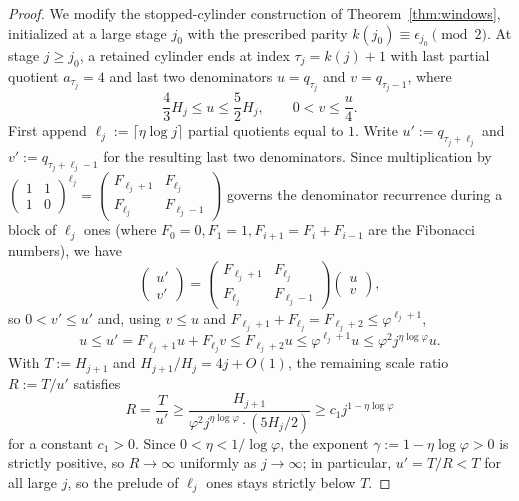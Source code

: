 \documentclass[11pt]{article}
\theoremstyle{definition}
\theoremstyle{remark}
\begin{document}
\begin{proof}
We modify the stopped-cylinder construction of Theorem~\ref{thm:windows},
initialized at a large stage $j_0$ with the prescribed parity
$k(j_0)\equiv\epsilon_{j_0}\pmod2$. At stage $j\ge j_0$, a retained cylinder ends
at index $\tau_j=k(j)+1$ with last partial quotient $a_{\tau_j}=4$ and last two
denominators $u=q_{\tau_j}$ and $v=q_{\tau_j-1}$, where
\[
\frac43 H_j\le u\le\frac52 H_j,\qquad 0<v\le\frac{u}{4}.
\]
First append $\ell_j:=\lceil\eta\log j\rceil$ partial quotients equal to $1$.
Write $u':=q_{\tau_j+\ell_j}$ and $v':=q_{\tau_j+\ell_j-1}$ for the resulting
last two denominators. Since multiplication by $\begin{pmatrix}1 & 1\\ 1 & 0\end{pmatrix}^{\ell_j}
=\begin{pmatrix}F_{\ell_j+1} & F_{\ell_j}\\ F_{\ell_j} & F_{\ell_j-1}\end{pmatrix}$
governs the denominator recurrence during a block of $\ell_j$ ones (where
$F_0=0,F_1=1,F_{i+1}=F_i+F_{i-1}$ are the Fibonacci numbers), we have
\[
\begin{pmatrix}u'\\ v'\end{pmatrix}
=\begin{pmatrix}F_{\ell_j+1} & F_{\ell_j}\\ F_{\ell_j} & F_{\ell_j-1}\end{pmatrix}
\begin{pmatrix}u\\ v\end{pmatrix},
\]
so $0<v'\le u'$ and, using $v\le u$ and $F_{\ell_j+1}+F_{\ell_j}=F_{\ell_j+2}\le\varphi^{\ell_j+1}$,
\[
u\le u'=F_{\ell_j+1}u+F_{\ell_j}v\le F_{\ell_j+2}u\le\varphi^{\ell_j+1}u
\le\varphi^2 j^{\eta\log\varphi}u.
\]
With $T:=H_{j+1}$ and $H_{j+1}/H_j=4j+O(1)$, the remaining scale ratio
$R:=T/u'$ satisfies
\[
R=\frac{T}{u'}\ge\frac{H_{j+1}}{\varphi^2 j^{\eta\log\varphi}\cdot(5H_j/2)}
\ge c_1 j^{1-\eta\log\varphi}
\]
for a constant $c_1>0$. Since $0<\eta<1/\log\varphi$, the exponent
$\gamma:=1-\eta\log\varphi>0$ is strictly positive, so $R\to\infty$ uniformly as
$j\to\infty$; in particular, $u'=T/R<T$ for all large $j$, so the prelude of
$\ell_j$ ones stays strictly below $T$.


\end{proof}
\end{document}
